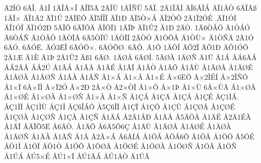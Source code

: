 {^^c42^^cd^^d3
6^^c4^^ce.
^^c41^^ce
1^^c4^^ce^^c5^^d7^^ce
^^c4^^ce^^cf5^^c4
2^^c4^^ce^^d9
1^^c4^^ce^^d1^^db
5^^c4^^cf.
2^^c41^^cf^^c2^^cc
^^c4^^cf6^^c2^^cc^^c1
^^c4^^cf1^^c2^^d2
6^^c4^^cf^^c2^^df
1^^c4^^cf^^d7
^^c4^^cf1^^c42
^^c4^^cf1^^da
2^^c4^^cf^^cb^^d4
^^c4^^cf5^^cd^^ce^^cf
^^c4^^cf1^^d0
^^c4^^cf5^^d2^^d7^^c1
^^c4^^cf2^^d2^^d5
2^^c41^^cf2^^d3^^c9
.^^c4^^cf1^^d3^^cd
^^c4^^cf1^^d3^^ce
^^c4^^cf1^^d32^^d0
5^^c4^^cf^^d4
6^^c4^^cf^^d4^^c4
^^c4^^cf^^d4^^cf1
1^^c4^^cf^^de
^^c4^^cf1^^db2
^^c41^^d0
2^^c4^^d2.
1^^c46^^d2^^c1^^d6
^^c41^^d2^^c1^^d3
^^c46^^d2^^c1^^d1
^^c41^^d2^^c5^^d6
1^^c4^^d2^^cf^^c2
6^^c45^^d2^^cf^^da
1^^c4^^d2^^cf^^cd
2^^c4^^d2^^d3
^^c41^^d2^^d5^^c2
^^c41^^d2^^d9^^d7
^^c41^^d2^^d1^^c4
2^^c41^^d3
6^^c4^^d3.
6^^c4^^d3^^cb.
^^c4^^d33^^cb^^ce
6^^c4^^d3^^d4^^d7.
6^^c4^^d3^^d4^^d8.
6^^c4^^d4.
^^c41^^d4
1^^c4^^d5^^ce
^^c4^^d52^^cf
^^c4^^d51^^d0
^^c4^^d51^^d3^^d4
2^^c41^^c6
^^c41^^c8
^^c41^^de
2^^c41^^db2
^^c4^^df1
6^^c4^^d8.
1^^c4^^d8^^c5
6^^c4^^d8^^cd.
5^^c4^^d8^^c0
1^^c4^^d8^^d1
^^c41^^dc
^^c51^^c1
^^c5^^c16^^c4^^c1
^^c5^^c12^^c4^^c5
^^c5^^c12^^da
^^c51^^c2^^c1
^^c51^^c2^^c5
^^c51^^c2^^c9
^^c51^^c2^^cf
^^c51^^c2^^d2
^^c51^^c2^^d5
^^c51^^c2^^d9
^^c51^^c2^^d8^^c5
^^c51^^c2^^d8^^c9
^^c51^^c2^^d8^^c0
^^c51^^c2^^d8^^d1
^^c51^^c2^^c0
^^c51^^c2^^d1
^^c51^^d7^^c1
^^c51^^d7^^c5
^^c51^^d7^^c9
^^c5^^d76^^cb^^d5
^^c5^^d72^^ce^^c9^^cd
^^c5^^d72^^ce^^d1^^d4
^^c51^^d7^^cf
6^^c5^^d7^^cf^^cc
^^c5^^d7^^cf2^^d3
^^c5^^d72^^d0
2^^c5^^d7^^d2
^^c52^^d7^^d2^^cf
^^c51^^d7^^d5
^^c5^^d71^^de
^^c51^^d7^^d9
6^^c5^^d7^^d9^^c4
^^c51^^d7^^d8^^c5
^^c51^^d7^^d8^^c9
^^c51^^d7^^d8^^c0
^^c51^^d7^^d8^^d1
^^c51^^d7^^c0
^^c51^^d7^^d1
^^c51^^c7^^c1
^^c51^^c7^^c4
^^c51^^c7^^c5
^^c51^^c7^^c9
^^c5^^c71^^cc^^c1.
^^c5^^c71^^cc^^cf
^^c5^^c71^^cc^^d9
^^c5^^c71^^ce
^^c5^^c76^^ce^^c1^^d4
^^c55^^c76^^ce^^cf
^^c51^^c7^^cf
^^c51^^c7^^d5
^^c51^^c7^^d9
^^c51^^c7^^d8^^c5
^^c51^^c7^^d8^^c9
^^c51^^c7^^d8^^c0
^^c51^^c7^^d8^^d1
^^c51^^c7^^c0
^^c51^^c7^^d1
^^c51^^c4^^c1
^^c52^^c41^^c1^^d0
^^c51^^c4^^c5
^^c55^^c4^^d6^^c5
^^c51^^c4^^c9
^^c52^^c41^^c9^^c0
^^c51^^c4^^cf
^^c5^^c4^^cf^^d55^^cb
^^c56^^c4^^d2.
^^c51^^c4^^d5
^^c56^^c45^^d56^^c7
^^c51^^c4^^d9
^^c51^^c4^^d8^^c5
^^c51^^c4^^d8^^c9
^^c51^^c4^^d8^^c0
^^c51^^c4^^d8^^d1
^^c51^^c4^^c0
^^c51^^c4^^d1
^^c51^^c5
^^c52^^c5^^d7^^c1
^^c56^^c5^^cd^^c1
^^c51^^d6^^c1
^^c5^^d6^^c16^^d4
^^c51^^d6^^c5
^^c51^^d6^^d6
^^c55^^d6^^c9
^^c5^^d61^^cd
^^c51^^d6^^cf
^^c5^^d61^^d2
^^c51^^d6^^d5
^^c51^^d6^^d8^^c5
^^c51^^d6^^d8^^c9
^^c51^^d6^^d8^^c0
^^c51^^d6^^d8^^d1
^^c51^^d6^^c0
^^c51^^d6^^d1
^^c51^^da^^c1
^^c5^^da5^^d7^^c9
^^c5^^da1^^d7^^cf
^^c5^^da1^^c4^^c1
^^c5^^da1^^c4^^d2
^^c51^^da^^c5
}
